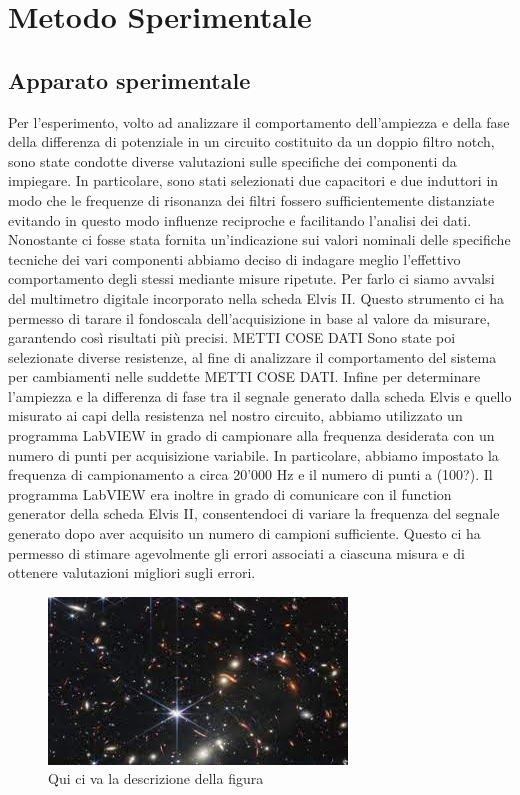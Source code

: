 \documentclass[12pt, letterpaper]{article}
\begin{document}
\section{Metodo Sperimentale}
\subsection{Apparato sperimentale}
Per l'esperimento, volto ad analizzare il comportamento dell'ampiezza e della fase della differenza di potenziale in un circuito costituito da un doppio filtro notch,  sono state condotte diverse valutazioni sulle specifiche dei componenti da impiegare. In particolare, sono stati selezionati due capacitori e due induttori in modo che le frequenze di risonanza dei filtri fossero sufficientemente distanziate evitando in questo modo influenze reciproche e facilitando l’analisi dei dati. 
Nonostante ci fosse stata fornita un’indicazione sui valori nominali delle specifiche tecniche dei vari componenti abbiamo deciso di indagare meglio l’effettivo comportamento degli stessi mediante misure ripetute. Per farlo ci siamo avvalsi del multimetro digitale incorporato nella scheda Elvis II. Questo strumento ci ha permesso di tarare il fondoscala dell'acquisizione in base al valore da misurare, garantendo così risultati più precisi.
METTI COSE DATI
Sono state poi selezionate diverse resistenze, al fine di analizzare il comportamento del sistema per cambiamenti nelle suddette METTI COSE DATI.
Infine per determinare l'ampiezza e la differenza di fase tra il segnale generato dalla scheda Elvis e quello misurato ai capi della resistenza nel nostro circuito, abbiamo utilizzato un programma LabVIEW in grado di campionare alla frequenza desiderata con un numero di punti per acquisizione variabile. In particolare, abbiamo impostato la frequenza di campionamento a circa 20'000 Hz e il numero di punti a (100?).
Il programma LabVIEW era inoltre in grado di comunicare con il function generator della scheda Elvis II, consentendoci di variare la frequenza del segnale generato dopo aver acquisito un numero di campioni sufficiente. Questo ci ha permesso di stimare agevolmente gli errori associati a ciascuna misura e di ottenere valutazioni migliori sugli errori.
\begin{figure}
\centering
\includegraphics[width=1.9\linewidth]{apparato_sperimentale.jpeg}
\caption{\label{fig:figura} Qui ci va la descrizione della figura}
 \end{figure}
 
\end{document}
